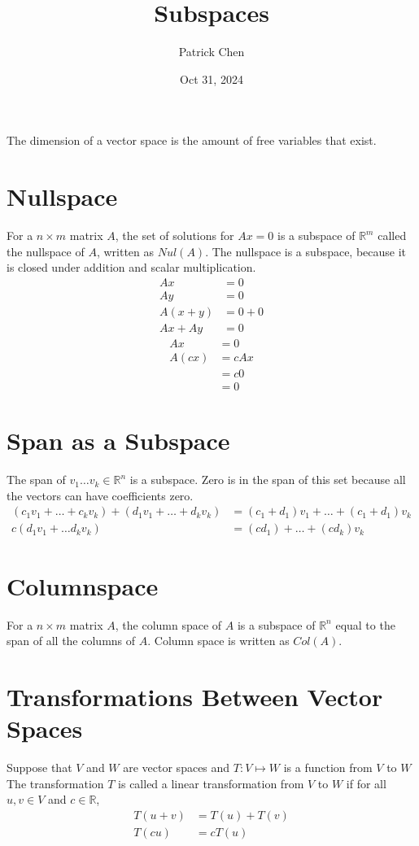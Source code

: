 \documentclass{article}
\title{Subspaces}
\author{Patrick Chen}
\date{Oct 31, 2024}
\theoremstyle{mytheoremstyle}
\theoremstyle{mytheoremstyle}
\theoremstyle{myproblemstyle}
\begin{document}
    \maketitle
    The dimension of a vector space is the amount of free variables that exist.

    \section*{Nullspace}
    For a $n\times m$ matrix $A$, the set of solutions for $Ax=0$ is a subspace
    of $\mathbb{R}^m$ called the nullspace of $A$, written as $Nul(A)$. The
    nullspace is a subspace, because it is closed under addition and scalar
    multiplication.
    \begin{align*}
        Ax &= 0 \\
        Ay &= 0 \\
        A(x + y) &= 0 + 0 \\
        Ax + Ay &= 0
    \end{align*}
    \begin{align*}
        Ax &= 0 \\
        A(cx) &= cAx \\
              &= c0 \\
              &= 0
    \end{align*}

    \section*{Span as a Subspace}
    The span of $v_1\dots v_k\in \mathbb{R}^n$ is a subspace. Zero is in the
    span of this set because all the vectors can have coefficients zero.
    \begin{align*}
        (c_1v_1 +\dots+c_kv_k) + (d_1v_1 +\dots+d_kv_k)
        &= (c_1+d_1)v_1 +\dots+(c_1+d_1)v_k \\
        c(d_1v_1+\dots d_kv_k) &= (cd_1)+\dots+(cd_k)v_k
    \end{align*}

    \section*{Columnspace}
    For a $n\times m$ matrix $A$, the column space of $A$ is a subspace of
    $\mathbb{R}^n$ equal to the span of all the columns of $A$. Column space is
    written as $Col(A)$.

    \section*{Transformations Between Vector Spaces}
    Suppose that $V$ and $W$ are vector spaces and $T: V \mapsto W$ is a
    function from $V$ to $W$ The transformation $T$ is called a linear
    transformation from $V$ to $W$ if for all $u,v\in V$ and $c\in \mathbb{R}$,
    \begin{align*}
        T(u+v) &= T(u) + T(v) \\
        T(cu) &= cT(u)
    \end{align*}
\end{document}
